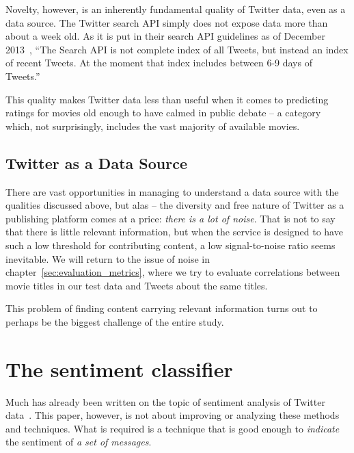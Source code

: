 Novelty, however, is an inherently fundamental quality of Twitter data, even as a data source.
The Twitter search API simply does not expose data more than about a week old.
As it is put in their search API guidelines as of December 2013~\cite{UsingTwitterSearchAPI}, ``The Search API is not complete index of all Tweets, but instead an index of recent Tweets. At the moment that index includes between 6-9 days of Tweets.''

This quality makes Twitter data less than useful when it comes to predicting ratings for movies old enough to have calmed in public debate -- a category which, not surprisingly, includes the vast majority of available movies.


\subsection{Twitter as a Data Source} %
\label{sub:twitter_as_a_data_source}

There are vast opportunities in managing to understand a data source with the qualities discussed above, but alas -- the diversity and free nature of Twitter as a publishing platform comes at a price: \emph{there is a lot of noise}.
That is not to say that there is little relevant information, but when the service is designed to have such a low threshold for contributing content, a low signal-to-noise ratio seems inevitable.
We will return to the issue of noise in chapter~\ref{sec:evaluation_metrics}, where we try to evaluate correlations between movie titles in our test data and Tweets about the same titles.

This problem of finding content carrying relevant information turns out to perhaps be the biggest challenge of the entire study.



\section{The sentiment classifier} %
\label{sec:the_sentiment_classifier}

Much has already been written on the topic of sentiment analysis of Twitter data~\cite{go2009twitter, go2009twitterdistant, pak2010twitter, agarwal2011sentiment, kouloumpis2011twitter}. This paper, however, is not about improving or analyzing these methods and techniques. What is required is a technique that is good enough to \emph{indicate} the sentiment of \emph{a set of messages}.

